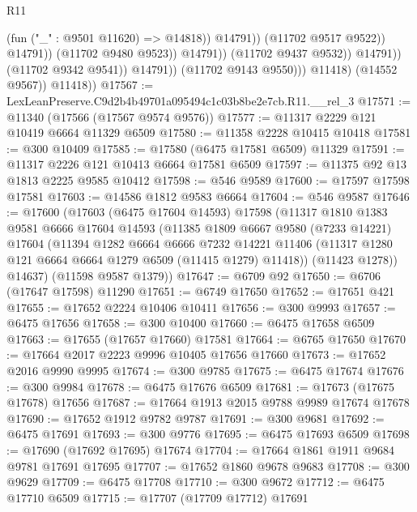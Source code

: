 \begin{lexlean}{R11}
\begin{coremodule}
                                              (fun ("_" : @9501 @11620) => @14818))
                                            @14791))
                                        (@11702 @9517 @9522))
                                      @14791))
                                  (@11702 @9480 @9523))
                                @14791))
                            (@11702 @9437 @9532))
                          @14791))
                      (@11702 @9342 @9541))
                    @14791))
                (@11702 @9143 @9550)))
            @11418)
          (@14552 @9567))
        @11418))
@17567 := LexLeanPreserve.C9d2b4b49701a095494c1c03b8be2e7cb.R11.__rel_3
@17571 := @11340 (@17566 (@17567 @9574 @9576))
@17577 := @11317 @2229 @121 @10419 @6664 @11329 @6509
@17580 := @11358 @2228 @10415 @10418
@17581 := @300 @10409
@17585 := @17580 (@6475 @17581 @6509) @11329
@17591 := @11317 @2226 @121 @10413 @6664 @17581 @6509
@17597 := @11375 @92 @13 @1813 @2225 @9585 @10412
@17598 := @546 @9589
@17600 := @17597 @17598 @17581
@17603 := @14586 @1812 @9583 @6664
@17604 := @546 @9587
@17646 := @17600
    (@17603
      (@6475 @17604 @14593)
      @17598
      (@11317
        @1810
        @1383
        @9581
        @6666
        @17604
        @14593
        (@11385
          @1809
          @6667
          @9580
          (@7233 @14221)
          @17604
          (@11394
            @1282
            @6664
            @6666
            @7232
            @14221
            @11406
            (@11317 @1280 @121 @6664 @6664 @1279 @6509 (@11415 @1279) @11418))
          (@11423 @1278))
        @14637)
      (@11598 @9587 @1379))
@17647 := @6709 @92
@17650 := @6706 (@17647 @17598) @11290
@17651 := @6749 @17650
@17652 := @17651 @421
@17655 := @17652 @2224 @10406 @10411
@17656 := @300 @9993
@17657 := @6475 @17656
@17658 := @300 @10400
@17660 := @6475 @17658 @6509
@17663 := @17655 (@17657 @17660) @17581
@17664 := @6765 @17650
@17670 := @17664 @2017 @2223 @9996 @10405 @17656 @17660
@17673 := @17652 @2016 @9990 @9995
@17674 := @300 @9785
@17675 := @6475 @17674
@17676 := @300 @9984
@17678 := @6475 @17676 @6509
@17681 := @17673 (@17675 @17678) @17656
@17687 := @17664 @1913 @2015 @9788 @9989 @17674 @17678
@17690 := @17652 @1912 @9782 @9787
@17691 := @300 @9681
@17692 := @6475 @17691
@17693 := @300 @9776
@17695 := @6475 @17693 @6509
@17698 := @17690 (@17692 @17695) @17674
@17704 := @17664 @1861 @1911 @9684 @9781 @17691 @17695
@17707 := @17652 @1860 @9678 @9683
@17708 := @300 @9629
@17709 := @6475 @17708
@17710 := @300 @9672
@17712 := @6475 @17710 @6509
@17715 := @17707 (@17709 @17712) @17691

\end{coremodule}
\end{lexlean}
